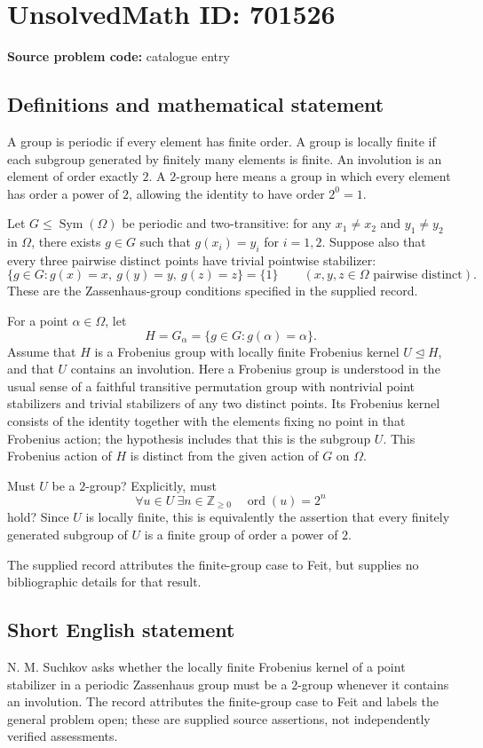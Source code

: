 \documentclass[11pt]{article}
\newcommand{\Z}{\mathbb{Z}}
\begin{document}
\section*{UnsolvedMath ID: 701526}
\textbf{Source problem code:} catalogue entry
\subsection{Definitions and mathematical statement}
A group is periodic if every element has finite order. A group is locally finite if each subgroup generated by finitely many elements is finite. An involution is an element of order exactly \(2\). A \(2\)-group here means a group in which every element has order a power of \(2\), allowing the identity to have order \(2^0=1\).

Let \(G\leq\operatorname{Sym}(\Omega)\) be periodic and two-transitive: for any \(x_1\ne x_2\) and \(y_1\ne y_2\) in \(\Omega\), there exists \(g\in G\) such that \(g(x_i)=y_i\) for \(i=1,2\). Suppose also that every three pairwise distinct points have trivial pointwise stabilizer:
\[
\{g\in G:g(x)=x,\ g(y)=y,\ g(z)=z\}=\{1\}
\qquad(x,y,z\in\Omega\text{ pairwise distinct}).
\]
These are the Zassenhaus-group conditions specified in the supplied record.

For a point \(\alpha\in\Omega\), let
\[
H=G_\alpha=\{g\in G:g(\alpha)=\alpha\}.
\]
Assume that \(H\) is a Frobenius group with locally finite Frobenius kernel \(U\trianglelefteq H\), and that \(U\) contains an involution. Here a Frobenius group is understood in the usual sense of a faithful transitive permutation group with nontrivial point stabilizers and trivial stabilizers of any two distinct points. Its Frobenius kernel consists of the identity together with the elements fixing no point in that Frobenius action; the hypothesis includes that this is the subgroup \(U\). This Frobenius action of \(H\) is distinct from the given action of \(G\) on \(\Omega\).

Must \(U\) be a \(2\)-group? Explicitly, must
\[
\forall u\in U\ \exists n\in\Z_{\geq 0}\quad \operatorname{ord}(u)=2^n
\]
hold? Since \(U\) is locally finite, this is equivalently the assertion that every finitely generated subgroup of \(U\) is a finite group of order a power of \(2\).

The supplied record attributes the finite-group case to Feit, but supplies no bibliographic details for that result.
\subsection{Short English statement}
N. M. Suchkov asks whether the locally finite Frobenius kernel of a point stabilizer in a periodic Zassenhaus group must be a \(2\)-group whenever it contains an involution. The record attributes the finite-group case to Feit and labels the general problem open; these are supplied source assertions, not independently verified assessments.
\end{document}
